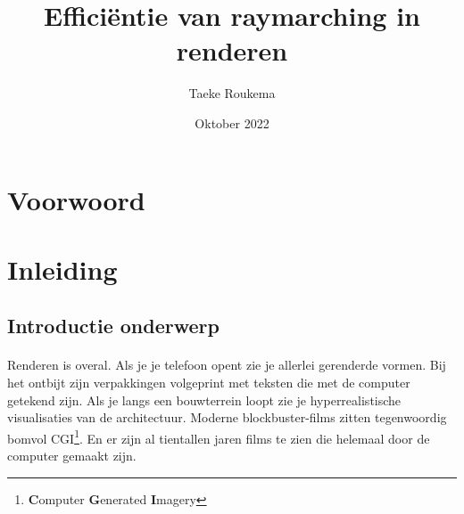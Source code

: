 \documentclass[12pt, a4paper]{article}
\title{Efficiëntie van raymarching in renderen}
\author{Taeke Roukema}
\date{Oktober 2022}
\begin{document}
\maketitle
\begin{abstract}
\end{abstract}
\clearpage
\tableofcontents{}
\clearpage
\section{Voorwoord}
\clearpage
\section{Inleiding}
\subsection{Introductie onderwerp}

\paragraph{}
Renderen is overal. Als je je telefoon opent zie je allerlei gerenderde vormen. Bij het ontbijt zijn verpakkingen volgeprint met teksten die met de computer getekend zijn. Als je langs een bouwterrein loopt zie je hyperrealistische visualisaties van de architectuur. Moderne blockbuster-films zitten tegenwoordig bomvol CGI\footnote{\textbf{C}omputer \textbf{G}enerated \textbf{I}magery}. En er zijn al tientallen jaren films te zien die helemaal door de computer gemaakt zijn. 
\end{document}
